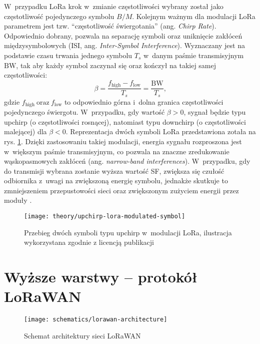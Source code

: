 W~przypadku LoRa krok w~zmianie częstotliwości wybrany został jako częstotliwość pojedynczego symbolu $B/M$. Kolejnym
ważnym dla modulacji LoRa parametrem jest tzw. \enquote{częstotliwość świergotania} (ang. \textsl{Chirp Rate}).
Odpowiednio dobrany, pozwala na separację symboli oraz uniknięcie zakłóceń międzysymbolowych (ISI, ang.
\textsl{Inter-Symbol Interference}). Wyznaczany jest na podstawie czasu trwania jednego symbolu $T_s$ w~danym paśmie
transmisyjnym $\mathrm{BW}$, tak aby każdy symbol zaczynał się oraz kończył na takiej samej częstotliwości:
\begin{equation}
    \beta = \frac{f_{\mathrm{high}}-f_{\mathrm{low}}}{T_s}=\frac{\mathrm{BW}}{T_s}\text{,}
\end{equation}
gdzie $f_{\mathrm{high}}\ \text{oraz}\ f_{\mathrm{low}}$ to odpowiednio górna i~dolna granica częstotliwości
pojedynczego świergotu. W~przypadku, gdy wartość $\beta > 0$, sygnał będzie typu upchirp (o częstotliwości rosnącej),
natomiast typu downchirp (o częstotliwości malejącej) dla $\beta < 0$. Reprezentacja dwóch symboli LoRa
\cite{lora-emulator} przedstawiona zotała na rys. \ref{img:upchirp-lora-modulated-symbol}. Dzięki zastosowaniu takiej
modulacji, energia sygnału rozproszona jest w~większym paśmie transmisyjnym, co pozwala na znaczne zredukowanie
wąskopasmowych zakłóceń (ang. \textsl{narrow-band interferences}). W~przypadku, gdy do transmisji wybrana zostanie
wyższa wartość SF, zwiększa się czułość odbiornika z~uwagi na zwiększoną energię symbolu, jednakże skutkuje to
zmniejszeniem przepustowości sieci oraz zwiększonym zużyciem energii przez moduły \cite{css-modulation-technique}.

\begin{figure}[!htbp]
    \centering
    \texttt{[image: theory/upchirp-lora-modulated-symbol]}
    \caption{\label{img:upchirp-lora-modulated-symbol}Przebieg dwóch symboli typu upchirp w~modulacji LoRa, ilustracja
        wykorzystana zgodnie z licencją publikacji \cite{lora-emulator}}
\end{figure}

\FloatBarrier
\section{\label{sect:lorawan}Wyższe warstwy -- protokół LoRaWAN}
\begin{figure}[!htbp]
    \centering
    \texttt{[image: schematics/lorawan-architecture]}
    \caption{\label{img:lorawan-architecture}Schemat architektury sieci LoRaWAN}
\end{figure}